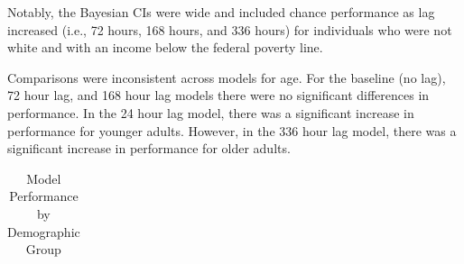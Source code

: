 \documentclass[
]{agujournal2019}
\begin{document}
Notably, the Bayesian CIs were wide and included chance performance as
lag increased (i.e., 72 hours, 168 hours, and 336 hours) for individuals
who were not white and with an income below the federal poverty line.

Comparisons were inconsistent across models for age. For the baseline
(no lag), 72 hour lag, and 168 hour lag models there were no significant
differences in performance. In the 24 hour lag model, there was a
significant increase in performance for younger adults. However, in the
336 hour lag model, there was a significant increase in performance for
older adults.

\begin{longtable}[]{@{}
  >{\raggedright\arraybackslash}p{}
  >{\raggedright\arraybackslash}p{}
  >{\raggedright\arraybackslash}p{}
  >{\raggedright\arraybackslash}p{}
  >{\raggedright\arraybackslash}p{}
  >{\raggedright\arraybackslash}p{}
  >{\raggedright\arraybackslash}p{}
  >{\raggedright\arraybackslash}p{}
  >{\raggedright\arraybackslash}p{}
  >{\raggedright\arraybackslash}p{}
  >{\raggedright\arraybackslash}p{}@{}}

\caption{\label{tbl-fairness}Model Performance by Demographic Group}

\tabularnewline


\end{longtable}
\end{document}
